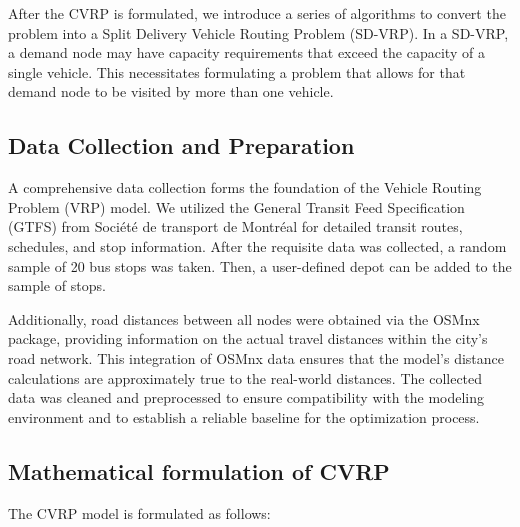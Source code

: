 \documentclass[12pt]{article}
\begin{document}
After the CVRP is formulated, we introduce a series of algorithms to convert the problem into a Split Delivery Vehicle Routing Problem (SD-VRP).
In a SD-VRP, a demand node may have capacity requirements that exceed the capacity of a single vehicle.
This necessitates formulating a problem that allows for that demand node to be visited by more than one vehicle.


\subsection{Data Collection and Preparation}

A comprehensive data collection forms the foundation of the Vehicle Routing Problem (VRP) model.
We utilized the General Transit Feed Specification (GTFS) from Société de transport de Montréal for detailed transit routes, schedules, and stop information.
After the requisite data was collected, a random sample of 20 bus stops was taken. Then, a user-defined depot can be added to the sample of stops.

Additionally, road distances between all nodes were obtained via the OSMnx package, providing information on the actual travel distances within the city's road network.
This integration of OSMnx data ensures that the model's distance calculations are approximately true to the real-world distances.
The collected data was cleaned and preprocessed to ensure compatibility with the modeling environment and to establish a reliable baseline for the optimization process.

\subsection{Mathematical formulation of CVRP} \label{sec:cvrp}

The CVRP model is formulated as follows:
\end{document}
